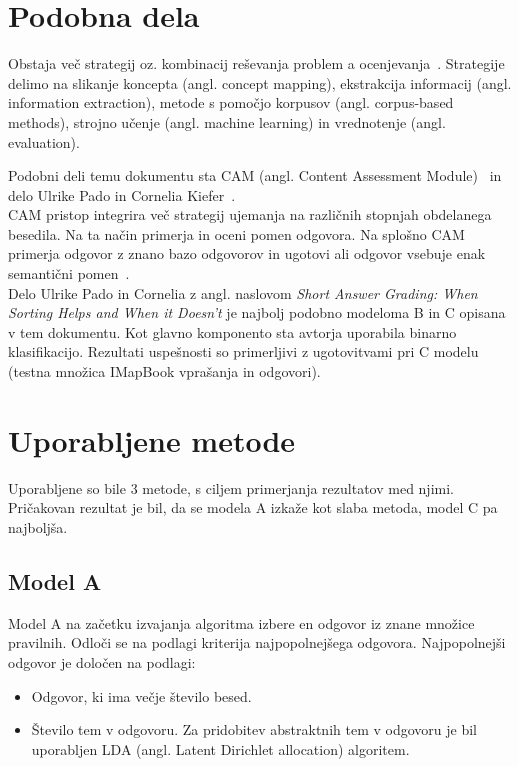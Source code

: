 \documentclass[journal]{IEEEtran}
\begin{document}
\section{Podobna dela}
Obstaja več strategij oz. kombinacij reševanja problem a ocenjevanja~\cite{adhya2016automated}.
Strategije delimo na slikanje koncepta (angl. concept mapping), ekstrakcija informacij (angl. information extraction), metode s pomočjo korpusov (angl. corpus-based methods), strojno učenje (angl. machine learning) in vrednotenje (angl. evaluation).

Podobni deli temu dokumentu sta CAM (angl. Content Assessment Module)~\cite{bailey2008content} in delo Ulrike Pado in Cornelia Kiefer~\cite{Kiefer}.\\

CAM pristop integrira več strategij ujemanja na različnih stopnjah obdelanega besedila. Na ta način primerja in oceni pomen odgovora.
Na splošno CAM primerja odgovor z znano bazo odgovorov in ugotovi ali odgovor vsebuje enak semantični pomen~\cite{bailey2008diagnosing}.\\

Delo Ulrike Pado in Cornelia z angl. naslovom \textit{Short Answer Grading: When Sorting Helps and When it Doesn’t} je najbolj podobno modeloma B in C opisana v tem dokumentu. Kot glavno komponento sta avtorja uporabila binarno klasifikacijo. Rezultati uspešnosti so primerljivi z ugotovitvami pri C modelu (testna množica IMapBook vprašanja in odgovori).

\section{Uporabljene metode}
Uporabljene so bile 3 metode, s ciljem primerjanja rezultatov med njimi. Pričakovan rezultat je bil, da se modela A izkaže kot slaba metoda, model C pa najboljša.

\subsection{Model A}
Model A na začetku izvajanja algoritma izbere en odgovor iz znane množice pravilnih. Odloči se na podlagi kriterija najpopolnejšega odgovora. Najpopolnejši odgovor je določen na podlagi:
\begin{itemize}
	\item Odgovor, ki ima večje število besed.
	\item Število tem v odgovoru. Za pridobitev abstraktnih tem  v odgovoru je bil uporabljen LDA (angl. Latent Dirichlet allocation) algoritem.
\end{itemize}
\end{document}
